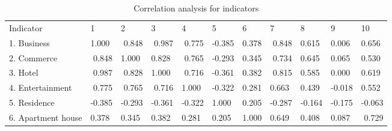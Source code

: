 %
\begin{sidewaystable}[htbp]
	\centering
	\caption{Correlation analysis for indicators}
	\label{tab:chp3:CorrelationAnalysis}
	\small
	\renewcommand{\arraystretch}{1.5} %
	\begin{tabular}{p{9em}|p{3em}<{\raggedleft}|p{3em}<{\raggedleft}|p{3em}<{\raggedleft}|p{3em}<{\raggedleft}|p{3em}<{\raggedleft}|p{3em}<{\raggedleft}|p{3em}<{\raggedleft}|p{3em}<{\raggedleft}|p{3em}<{\raggedleft}|p{3em}<{\raggedleft}}
		\Xhline{1.5pt}
		Indicator & 1 & 2 & 3 & 4 & 5 & 6 & 7 & 8 & 9 & 10 \\
		
		\Xhline{0.5pt}
		1. Business & 1.000 & \multicolumn{1}{r|}{\cellcolor[rgb]{ 0.8, 0.8, 0.8} 0.848} & \multicolumn{1}{r|}{\cellcolor[rgb]{ 0.8, 0.8, 0.8} 0.987} & \multicolumn{1}{r|}{\cellcolor[rgb]{ 0.8, 0.8, 0.8} 0.775} & -0.385 & 0.378  & \multicolumn{1}{r|}{\cellcolor[rgb]{ 0.8, 0.8, 0.8} 0.848} & 0.615  & 0.006  & 0.656 \\
		
		2. Commerce & \multicolumn{1}{r|}{\cellcolor[rgb]{ 0.8, 0.8, 0.8} 0.848} & 1.000 & {\cellcolor[rgb]{ 0.8, 0.8, 0.8} 0.828}  & \multicolumn{1}{r|}{\cellcolor[rgb]{ 0.8, 0.8, 0.8} 0.765} & -0.293 & 0.345  & \multicolumn{1}{r|}{\cellcolor[rgb]{ 0.8, 0.8, 0.8} 0.734} & 0.645  & 0.065  & 0.530 \\
		
		3. Hotel & \multicolumn{1}{r|}{\cellcolor[rgb]{ 0.8, 0.8, 0.8} 0.987} & \multicolumn{1}{r|}{\cellcolor[rgb]{ 0.8, 0.8, 0.8} 0.828} & 1.000 & \multicolumn{1}{r|}{\cellcolor[rgb]{ 0.8, 0.8, 0.8} 0.716} & -0.361 & 0.382  & \multicolumn{1}{r|}{\cellcolor[rgb]{ 0.8, 0.8, 0.8} 0.815} & 0.585  & 0.000  & 0.619 \\
		
		4. Entertainment & \multicolumn{1}{r|}{\cellcolor[rgb]{ 0.8, 0.8, 0.8} 0.775} & \multicolumn{1}{r|}{\cellcolor[rgb]{ 0.8, 0.8, 0.8} 0.765} & \multicolumn{1}{r|}{\cellcolor[rgb]{ 0.8, 0.8, 0.8} 0.716} & 1.000 & -0.322 & 0.281  & 0.663  & 0.439  & -0.018 & 0.552 \\
		
		5. Residence & -0.385 & -0.293 & -0.361 & -0.322 & 1.000 & 0.205  & -0.287 & -0.164 & -0.175 & -0.063 \\
		
		6. Apartment house & 0.378  & 0.345  & 0.382  & 0.281  & 0.205  & 1.000 & 0.649  & 0.408  &0.087  & \multicolumn{1}{r}{\cellcolor[rgb]{ 0.8, 0.8, 0.8} 0.729} \\
		

\end{tabular}
\end{sidewaystable}
